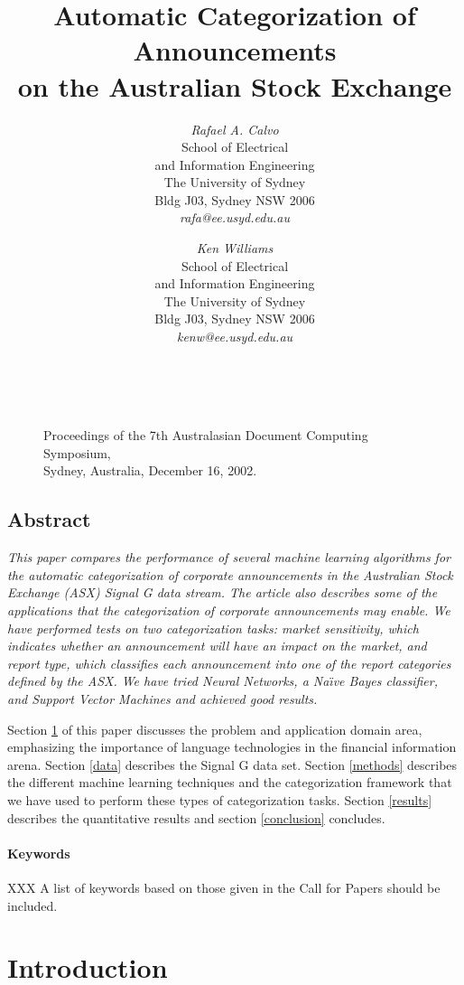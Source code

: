 \documentclass[twocolumn]{article}
\title{Automatic Categorization of Announcements \\ on the Australian Stock Exchange}
\author{
{\em Rafael A. Calvo}\\[1ex]
School of Electrical\\
and Information Engineering\\
The University of Sydney\\
Bldg J03, Sydney NSW 2006\\[1ex]
{\em rafa@ee.usyd.edu.au}
\and
{\em Ken Williams}\\[1ex]
School of Electrical\\
and Information Engineering\\
The University of Sydney\\
Bldg J03, Sydney NSW 2006\\[1ex]
{\em kenw@ee.usyd.edu.au}
}
\begin{document}
\maketitle
\thispagestyle{empty}

        \begin{figure}[b]
	~\\
        \noindent
        {\small\bf\raggedright
        Proceedings of the 7th Australasian 
	Document Computing Symposium,\\
	Sydney, Australia,
        December 16, 2002.
        }
        \end{figure}


\subsection*{\centering Abstract}
\noindent
{\it 
This paper compares the performance of several machine learning
algorithms for the automatic categorization of corporate announcements
in the Australian Stock Exchange (ASX) Signal G data stream. The
article also describes some of the applications that the
categorization of corporate announcements may enable. We have
performed tests on two categorization tasks: market sensitivity, which
indicates whether an announcement will have an impact on the market,
and report type, which classifies each announcement into one of the
report categories defined by the ASX. We have tried Neural Networks, a
Na\"\i ve Bayes classifier, and Support Vector Machines and achieved
good results.

Section \ref{introduction} of this paper discusses the problem and
application domain area, emphasizing the importance of language
technologies in the financial information arena. Section \ref{data}
describes the Signal G data set.  Section \ref{methods} describes the
different machine learning techniques and the categorization framework
that we have used to perform these types of categorization
tasks. Section \ref{results} describes the quantitative results and
section \ref{conclusion} concludes.
}

\paragraph{Keywords} 
XXX
A list of keywords based on those given in the Call for Papers should be included.

\section{Introduction}
\label{introduction}
\end{document}
